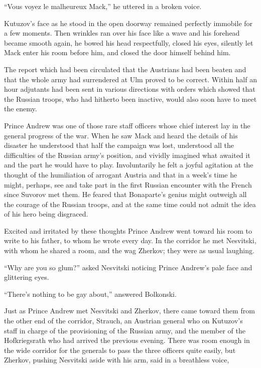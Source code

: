 ``Vous voyez le malheureux Mack,'' he uttered in a broken voice.

Kutuzov's face as he stood in the open doorway remained perfectly
immobile for a few moments. Then wrinkles ran over his face like
a wave and his forehead became smooth again, he bowed his head
respectfully, closed his eyes, silently let Mack enter his room
before him, and closed the door himself behind him.

The report which had been circulated that the Austrians had been
beaten and that the whole army had surrendered at Ulm proved to
be correct.  Within half an hour adjutants had been sent in
various directions with orders which showed that the Russian
troops, who had hitherto been inactive, would also soon have to
meet the enemy.

Prince Andrew was one of those rare staff officers whose chief
interest lay in the general progress of the war. When he saw Mack
and heard the details of his disaster he understood that half the
campaign was lost, understood all the difficulties of the Russian
army's position, and vividly imagined what awaited it and the
part he would have to play.  Involuntarily he felt a joyful
agitation at the thought of the humiliation of arrogant Austria
and that in a week's time he might, perhaps, see and take part in
the first Russian encounter with the French since Suvorov met
them. He feared that Bonaparte's genius might outweigh all the
courage of the Russian troops, and at the same time could not
admit the idea of his hero being disgraced.

Excited and irritated by these thoughts Prince Andrew went toward
his room to write to his father, to whom he wrote every day. In
the corridor he met Nesvitski, with whom he shared a room, and
the wag Zherkov; they were as usual laughing.

``Why are you so glum?'' asked Nesvitski noticing Prince Andrew's
pale face and glittering eyes.

``There's nothing to be gay about,'' answered Bolkonski.

Just as Prince Andrew met Nesvitski and Zherkov, there came
toward them from the other end of the corridor, Strauch, an
Austrian general who on Kutuzov's staff in charge of the
provisioning of the Russian army, and the member of the
Hofkriegsrath who had arrived the previous evening.  There was
room enough in the wide corridor for the generals to pass the
three officers quite easily, but Zherkov, pushing Nesvitski aside
with his arm, said in a breathless voice,

